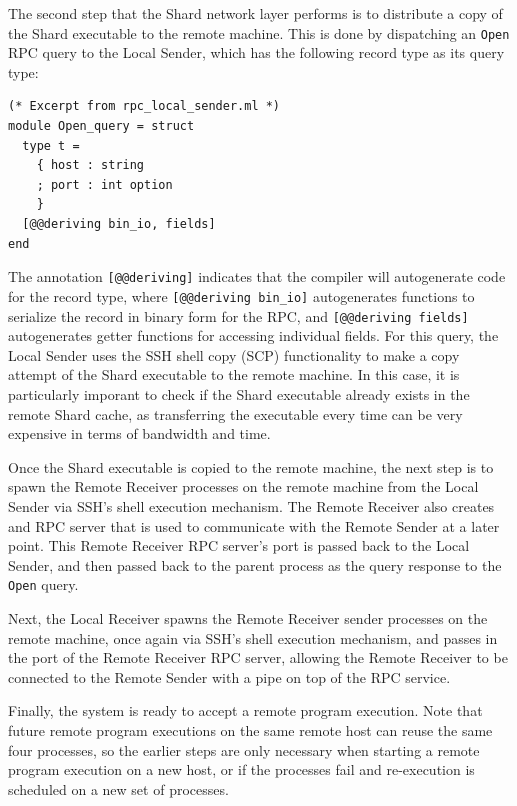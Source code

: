 \documentclass[twoside]{report}
\begin{document}
The second step that the Shard network layer performs is to distribute a copy of the Shard executable to the remote machine.
This is done by dispatching an \texttt{Open} RPC query to the Local Sender, which has the following record type as its query type:

\begin{minipage}[c]{\textwidth-15pt}
  \begin{lstlisting}
(* Excerpt from rpc_local_sender.ml *)
module Open_query = struct
  type t =
    { host : string
    ; port : int option
    }
  [@@deriving bin_io, fields]
end
\end{lstlisting}
  \smallskip
\end{minipage}

The annotation \texttt{[@@deriving]} indicates that the compiler will autogenerate code for the record type, where \texttt{[@@deriving bin\_io]} autogenerates functions to serialize the record in binary form for the RPC, and \texttt{[@@deriving fields]} autogenerates getter functions for accessing individual fields.
For this query, the Local Sender uses the SSH shell copy (SCP) functionality to make a copy attempt of the Shard executable to the remote machine.
In this case, it is particularly imporant to check if the Shard executable already exists in the remote Shard cache, as transferring the executable every time can be very expensive in terms of bandwidth and time.

Once the Shard executable is copied to the remote machine, the next step is to spawn the Remote Receiver processes on the remote machine from the Local Sender via SSH's shell execution mechanism.
The Remote Receiver also creates and RPC server that is used to communicate with the Remote Sender at a later point.
This Remote Receiver RPC server's port is passed back to the Local Sender, and then passed back to the parent process as the query response to the \texttt{Open} query.

Next, the Local Receiver spawns the Remote Receiver sender processes on the remote machine, once again via SSH's shell execution mechanism, and passes in the port of the Remote Receiver RPC server, allowing the Remote Receiver to be connected to the Remote Sender with a pipe on top of the RPC service.

Finally, the system is ready to accept a remote program execution.
Note that future remote program executions on the same remote host can reuse the same four processes, so the earlier steps are only necessary when starting a remote program execution on a new host, or if the processes fail and re-execution is scheduled on a new set of processes.
\end{document}

